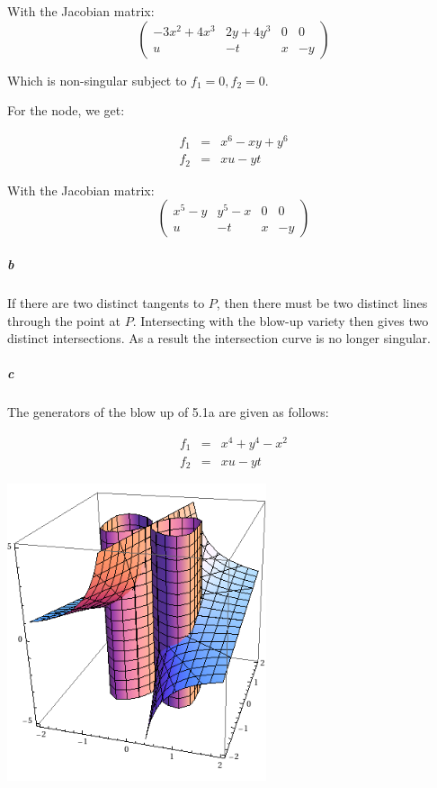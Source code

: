 \documentclass{article}
\begin{document}
With the Jacobian matrix:
\[
\begin{pmatrix}
-3x^2 + 4x^3 & 2y+4y^3 & 0 & 0 \\
u & -t & x & -y
\end{pmatrix}
\]

Which is non-singular subject to $f_1=0, f_2=0$.

For the node, we get:

\begin{eqnarray*}
f_1 & = & x^6 - x y + y^6 \\
f_2 & = & x u - y t
\end{eqnarray*}

With the Jacobian matrix:
\[
\begin{pmatrix}
x^5 - y & y^5 - x & 0 & 0 \\
u & -t & x & -y
\end{pmatrix}
\]

\subparagraph{b}
If there are two distinct tangents to $P$, then there must be two distinct lines through the point at $P$.  Intersecting with the blow-up variety then gives two distinct intersections.  As a result the intersection curve is no longer singular.

\subparagraph{c}
The generators of the blow up of 5.1a are given as follows:

\begin{eqnarray*}
f_1 & = & x^4 + y^4 - x^2 \\
f_2 & = & x u - y t
\end{eqnarray*}

\begin{center}
\includegraphics[width=3in]{blowup.png}
\end{center}
\end{document}
